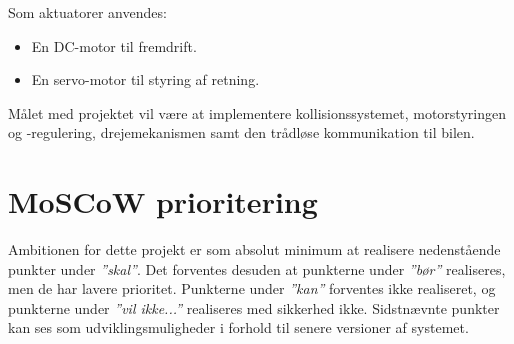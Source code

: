 Som aktuatorer anvendes:

\begin{itemize}\itemsep1pt \parskip0pt 
	\item En DC-motor til fremdrift.
	\item En servo-motor til styring af retning.
\end{itemize}

Målet med projektet vil være at implementere  kollisionssystemet, motorstyringen og -regulering, drejemekanismen samt den trådløse kommunikation til bilen.

\clearpage


\section*{MoSCoW prioritering} \label{sec:moscow_prioritering}

Ambitionen for dette projekt er som absolut minimum at realisere nedenstående punkter under \textit{''skal''}. 
Det forventes desuden at punkterne under \textit{''bør''} realiseres, men de har lavere prioritet.
Punkterne under \textit{''kan''} forventes ikke realiseret, og punkterne under \textit{''vil ikke...''} realiseres med sikkerhed ikke. 
Sidstnævnte punkter kan ses som udviklingsmuligheder i forhold til senere versioner af systemet. 

